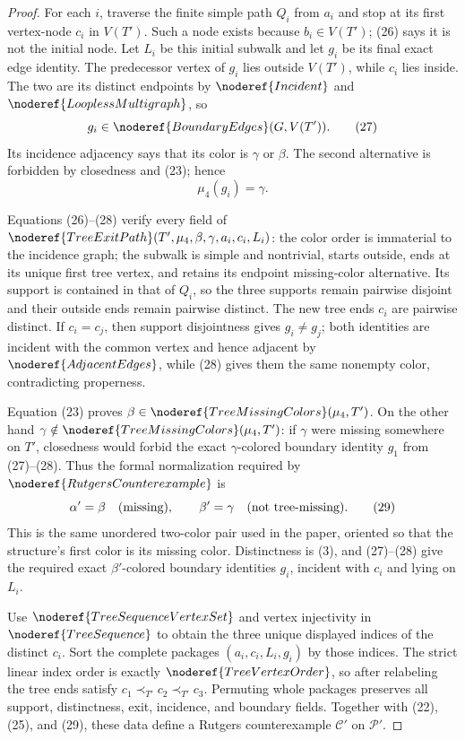 \begin{proof}
For each \(i\), traverse the finite simple path \(Q_i\) from \(a_i\)
and stop at its first vertex-node \(c_i\) in \(V(T')\).  Such a node
exists because \(b_i\in V(T')\); (26) says it is not the initial node.
Let \(L_i\) be this initial subwalk and let \(g_i\) be its final exact
edge identity.  The predecessor vertex of \(g_i\) lies outside
\(V(T')\), while \(c_i\) lies inside.  The two are its distinct endpoints
by \(\noderef{Incident}\) and \(\noderef{LooplessMultigraph}\), so
\[
                         g_i\in\noderef{BoundaryEdges}(G,V(T')). \tag{27}
\]
Its incidence adjacency says that its color is \(\gamma\) or \(\beta\).
The second alternative is forbidden by closedness and (23); hence
\[
                         \mu_4(g_i)=\gamma.                   \tag{28}
\]

Equations (26)--(28) verify every field of
\(\noderef{TreeExitPath}(T',\mu_4,\beta,\gamma,a_i,c_i,L_i)\):
the color order is immaterial to the incidence graph; the subwalk is
simple and nontrivial, starts outside, ends at its unique first tree
vertex, and retains its endpoint missing-color alternative.  Its support
is contained in that of \(Q_i\), so the three supports remain pairwise
disjoint and their outside ends remain pairwise distinct.  The new tree
ends \(c_i\) are pairwise distinct.  If \(c_i=c_j\), then support
disjointness gives \(g_i\ne g_j\); both identities are incident with the
common vertex and hence adjacent by \(\noderef{AdjacentEdges}\), while
(28) gives them the same nonempty color, contradicting properness.

Equation (23) proves
\(\beta\in\noderef{TreeMissingColors}(\mu_4,T')\).  On the other hand
\(\gamma\notin\noderef{TreeMissingColors}(\mu_4,T')\): if \(\gamma\)
were missing somewhere on \(T'\), closedness would forbid the exact
\(\gamma\)-colored boundary identity \(g_1\) from (27)--(28).
Thus the formal normalization required by
\(\noderef{RutgersCounterexample}\) is
\[
                \alpha'=\beta\quad\hbox{(missing)},\qquad
                \beta'=\gamma\quad\hbox{(not tree-missing)}. \tag{29}
\]
This is the same unordered two-color pair used in the paper, oriented so
that the structure's first color is its missing color.  Distinctness is
(3), and (27)--(28) give the required exact \(\beta'\)-colored boundary
identities \(g_i\), incident with \(c_i\) and lying on \(L_i\).

Use \(\noderef{TreeSequenceVertexSet}\) and vertex injectivity in
\(\noderef{TreeSequence}\) to obtain the three unique displayed indices
of the distinct \(c_i\).  Sort the complete packages
\((a_i,c_i,L_i,g_i)\) by those indices.  The strict linear index order is
exactly \(\noderef{TreeVertexOrder}\), so after relabeling the tree ends
satisfy \(c_1\prec_{T'}c_2\prec_{T'}c_3\).  Permuting whole packages
preserves all support, distinctness, exit, incidence, and boundary fields.
Together with (22), (25), and (29), these data define a Rutgers
counterexample \(\mathcal C'\) on \(\mathcal P'\).


\end{proof}
